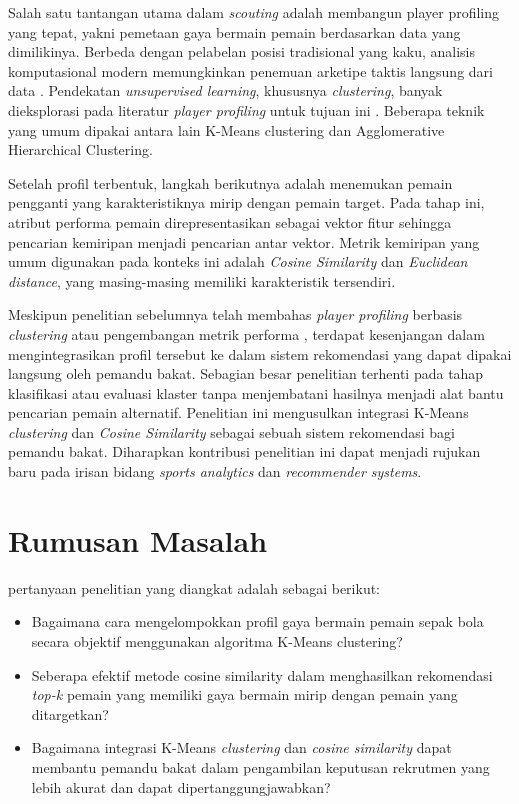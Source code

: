 Salah satu tantangan utama dalam \emph{scouting} adalah membangun player profiling yang tepat, yakni pemetaan gaya bermain pemain berdasarkan data yang dimilikinya. Berbeda dengan pelabelan posisi tradisional yang kaku, analisis komputasional modern memungkinkan penemuan arketipe taktis langsung dari data \parencite{bialkowski2014}. Pendekatan \emph{unsupervised learning}, khususnya \emph{clustering}, banyak dieksplorasi pada literatur \emph{player profiling} untuk tujuan ini \parencite{shen2026,akif2022}. Beberapa teknik yang umum dipakai antara lain K-Means clustering dan Agglomerative Hierarchical Clustering.

Setelah profil terbentuk, langkah berikutnya adalah menemukan pemain pengganti yang karakteristiknya mirip dengan pemain target. Pada tahap ini, atribut performa pemain direpresentasikan sebagai vektor fitur sehingga pencarian kemiripan menjadi pencarian antar vektor. Metrik kemiripan yang umum digunakan pada konteks ini adalah \emph{Cosine Similarity} dan \emph{Euclidean distance}, yang masing-masing memiliki karakteristik tersendiri.

Meskipun penelitian sebelumnya telah membahas \emph{player profiling} berbasis \emph{clustering} \parencite{shen2026,akif2022} atau pengembangan metrik performa \parencite{elsharkawi2025}, terdapat kesenjangan dalam mengintegrasikan profil tersebut ke dalam sistem rekomendasi yang dapat dipakai langsung oleh pemandu bakat. Sebagian besar penelitian terhenti pada tahap klasifikasi atau evaluasi klaster tanpa menjembatani hasilnya menjadi alat bantu pencarian pemain alternatif. Penelitian ini mengusulkan integrasi K-Means \emph{clustering} dan \emph{Cosine Similarity} sebagai sebuah sistem rekomendasi bagi pemandu bakat. Diharapkan kontribusi penelitian ini dapat menjadi rujukan baru pada irisan bidang \emph{sports analytics} dan \emph{recommender systems}.

\section{Rumusan Masalah}
\label{sec:rumusan-masalah}

pertanyaan penelitian yang diangkat adalah sebagai berikut:

\begin{itemize}
  \item Bagaimana cara mengelompokkan profil gaya bermain pemain sepak bola secara objektif menggunakan algoritma K-Means clustering?
  \item Seberapa efektif metode cosine similarity dalam menghasilkan rekomendasi \emph{top-k} pemain yang memiliki gaya bermain mirip dengan pemain yang ditargetkan?
  \item Bagaimana integrasi K-Means \emph{clustering} dan \emph{cosine similarity} dapat membantu pemandu bakat dalam pengambilan keputusan rekrutmen yang lebih akurat dan dapat dipertanggungjawabkan?
\end{itemize}

